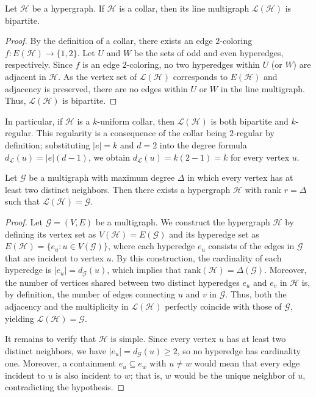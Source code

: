 \documentclass[12pt,reqno]{amsart}
\begin{document}
\begin{theorem}\label{teo:collar_bipartite}
Let $\mathcal{H}$ be a hypergraph. If $\mathcal{H}$ is a collar, then its line multigraph $\mathcal{L}(\mathcal{H})$ is bipartite.
\end{theorem}
\begin{proof}
By the definition of a collar, there exists an edge $2$-coloring $f: E(\mathcal{H}) \to \{1, 2\}$. Let $U$ and $W$ be the sets of odd and even hyperedges, respectively. Since $f$ is an edge $2$-coloring, no two hyperedges within $U$ (or $W$) are adjacent in $\mathcal{H}$. As the vertex set of $\mathcal{L}(\mathcal{H})$ corresponds to $E(\mathcal{H})$ and adjacency is preserved, there are no edges within $U$ or $W$ in the line multigraph. Thus, $\mathcal{L}(\mathcal{H})$ is bipartite.
\end{proof}

\begin{remark}\label{rem:collar_uniform}
In particular, if $\mathcal{H}$ is a $k$-uniform collar, then $\mathcal{L}(\mathcal{H})$ is both bipartite and $k$-regular. This regularity is a consequence of the collar being $2$-regular by definition; substituting $|e|=k$ and $d=2$ into the degree formula $d_{\mathcal{L}}(u) = |e|(d-1)$, we obtain $d_{\mathcal{L}}(u) = k(2-1) = k$ for every vertex $u$.
\end{remark}

\begin{proposition}\label{prop:all_multigraphs}
Let $\mathcal{G}$ be a multigraph with maximum degree $\Delta$ in which every vertex has at least two distinct neighbors. Then there exists a hypergraph $\mathcal{H}$ with rank $r = \Delta$ such that $\mathcal{L}(\mathcal{H}) = \mathcal{G}$.
\end{proposition}
\begin{proof}
Let $\mathcal{G} = (V, E)$ be a multigraph. We construct the hypergraph $\mathcal{H}$ by defining its vertex set as $V(\mathcal{H}) = E(\mathcal{G})$ and its hyperedge set as $E(\mathcal{H}) = \{e_u : u \in V(\mathcal{G})\}$, where each hyperedge $e_u$ consists of the edges in $\mathcal{G}$ that are incident to vertex $u$. By this construction, the cardinality of each hyperedge is $|e_u| = d_{\mathcal{G}}(u)$, which implies that $\text{rank}(\mathcal{H}) = \Delta(\mathcal{G})$. Moreover, the number of vertices shared between two distinct hyperedges $e_u$ and $e_v$ in $\mathcal{H}$ is, by definition, the number of edges connecting $u$ and $v$ in $\mathcal{G}$. Thus, both the adjacency and the multiplicity in $\mathcal{L}(\mathcal{H})$ perfectly coincide with those of $\mathcal{G}$, yielding $\mathcal{L}(\mathcal{H}) = \mathcal{G}$.

It remains to verify that $\mathcal{H}$ is simple. Since every vertex $u$ has at least two distinct neighbors, we have $|e_u| = d_{\mathcal{G}}(u) \geq 2$, so no hyperedge has cardinality one. Moreover, a containment $e_u \subseteq e_w$ with $u \neq w$ would mean that every edge incident to $u$ is also incident to $w$; that is, $w$ would be the unique neighbor of $u$, contradicting the hypothesis.
\end{proof}
\end{document}
